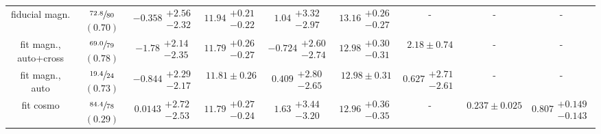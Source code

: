 \documentclass[a4paper,11pt]{article}
\begin{document}
\begin{table}
\begin{center}
\begin{tabular}{ccccccccc}
            fiducial magn. & $\sfrac{72.8}{80}$ $(0.70)$ & $-0.358\substack{+2.56 \\ -2.32}$ & $11.94\substack{+0.21 \\ -0.22}$ & $1.04\substack{+3.32 \\ -2.97}$ & $13.16\substack{+0.26 \\ -0.27}$  & - & - & - \\
            fit magn., auto+cross & $\sfrac{69.0}{79}$ $(0.78)$ & $-1.78\substack{+2.14 \\ -2.35}$ & $11.79\substack{+0.26 \\ -0.27}$ & $-0.724\substack{+2.60 \\ -2.74}$ & $12.98\substack{+0.30 \\ -0.31}$  & $2.18 \pm 0.74$ & - & - \\
            fit magn., auto & $\sfrac{19.4}{24}$ $(0.73)$ & $-0.844\substack{+2.29 \\ -2.17}$ & $11.81 \pm 0.26$ & $0.409\substack{+2.80 \\ -2.65}$ & $12.98 \pm 0.31$  & $0.627\substack{+2.71 \\ -2.61}$ & - & - \\
            fit cosmo & $\sfrac{84.4}{78}$ $(0.29)$ & $0.0143\substack{+2.72 \\ -2.53}$ & $11.79\substack{+0.27 \\ -0.24}$ & $1.63\substack{+3.44 \\ -3.20}$ & $12.96\substack{+0.36 \\ -0.35}$  & - & $0.237 \pm 0.025$ & $0.807\substack{+0.149 \\ -0.143}$ \\
            \hline \hline
          \end{tabular}
        \end{center}
      \end{table}
      
\end{document}

